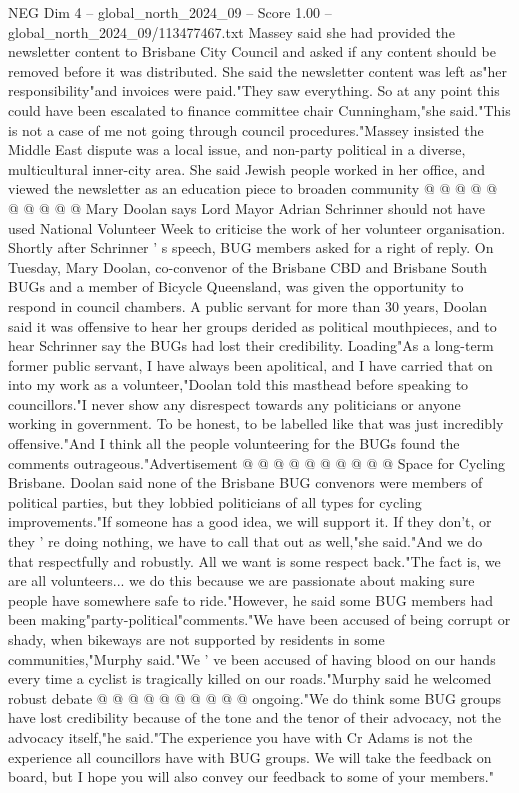 \begin{textsample}{NEG Dim 4 – global\_north\_2024\_09 – Score 1.00 – global\_north\_2024\_09/113477467.txt}
Massey said she had provided the newsletter content to Brisbane City Council and asked if any content should be removed before it was distributed.
She said the newsletter content was left as"her responsibility"and invoices were paid."They saw everything.
So at any point this could have been escalated to finance committee chair Cunningham,"she said."This is not a case of me not going through council procedures."Massey insisted the Middle East dispute was a local issue, and non-party political in a diverse, multicultural inner-city area.
She said Jewish people worked in her office, and viewed the newsletter as an education piece to broaden community @ @ @ @ @ @ @ @ @ @ Mary Doolan says Lord Mayor Adrian Schrinner should not have used National Volunteer Week to criticise the work of her volunteer organisation.
Shortly after Schrinner ' s speech, BUG members asked for a right of reply.
On Tuesday, Mary Doolan, co-convenor of the Brisbane CBD and Brisbane South BUGs and a member of Bicycle Queensland, was given the opportunity to respond in council chambers.
A public servant for more than 30 years, Doolan said it was offensive to hear her groups derided as political mouthpieces, and to hear Schrinner say the BUGs had lost their credibility.
Loading"As a long-term former public servant, I have always been apolitical, and I have carried that on into my work as a volunteer,"Doolan told this masthead before speaking to councillors."I never show any disrespect towards any politicians or anyone working in government.
To be honest, to be labelled like that was just incredibly offensive."And I think all the people volunteering for the BUGs found the comments outrageous."Advertisement @ @ @ @ @ @ @ @ @ @ Space for Cycling Brisbane.
Doolan said none of the Brisbane BUG convenors were members of political parties, but they lobbied politicians of all types for cycling improvements."If someone has a good idea, we will support it.
If they don't, or they ' re doing nothing, we have to call that out as well,"she said."And we do that respectfully and robustly.
All we want is some respect back."The fact is, we are all volunteers... we do this because we are passionate about making sure people have somewhere safe to ride."However, he said some BUG members had been making"party-political"comments."We have been accused of being corrupt or shady, when bikeways are not supported by residents in some communities,"Murphy said."We ' ve been accused of having blood on our hands every time a cyclist is tragically killed on our roads."Murphy said he welcomed robust debate @ @ @ @ @ @ @ @ @ @ ongoing."We do think some BUG groups have lost credibility because of the tone and the tenor of their advocacy, not the advocacy itself,"he said."The experience you have with Cr Adams is not the experience all councillors have with BUG groups.
We will take the feedback on board, but I hope you will also convey our feedback to some of your members."

\end{textsample}
